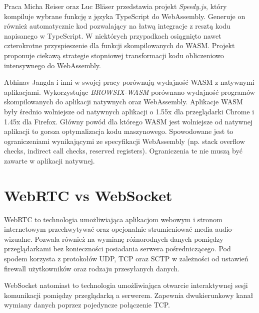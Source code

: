 \documentclass[language=polish,type=master]{aghmodern}
\begin{document}
Praca \cite{wasm_speedyjs} Micha Reiser oraz Luc Bl\"{a}ser przedstawia projekt \emph{Speedy.js}, który kompiluje wybrane funkcję z języka TypeScript\footnotemark{} do WebAssembly.
Generuje on również automatycznie kod pozwalający na łatwą integracje z resztą kodu napisanego w TypeScript.
W niektórych przypadkach osiągnięto nawet czterokrotne przyspieszenie dla funkcji skompilowanych do WASM.
Projekt proponuje ciekawą strategie stopniowej transformacji kodu obliczeniowo intensywnego do WebAssembly.

Abhinav Jangda i inni w swojej pracy \cite{wasm_native} porównują wydajność WASM z natywnymi aplikacjami.
Wykorzystując \emph{BROWSIX-WASM}\footnotemark{} porównano wydajność programów skompilowanych do aplikacji natywnych oraz WebAssembly.
Aplikacje WASM były średnio wolniejsze od natywnych aplikacji o 1.55x dla przeglądarki Chrome i 1.45x dla Firefox.
Główny powód dla którego WASM jest wolniejsze od natywnej aplikacji to gorsza optymalizacja kodu maszynowego.
Spowodowane jest to ograniczeniami wynikającymi ze specyfikacji WebAssembly (np. stack overflow checks, indirect call checks, reserved registers).
Ograniczenia te nie muszą być zawarte w aplikacji natywnej.

\section{WebRTC vs WebSocket}

WebRTC to technologia umożliwiająca aplikacjom webowym i stronom internetowym przechwytywać oraz opcjonalnie strumieniować media audio-wizualne.
Pozwala również na wymianę różnorodnych danych pomiędzy przeglądarkami bez konieczności posiadania serwera pośredniczącego.
Pod spodem korzysta z protokołów UDP, TCP oraz SCTP w zależności od ustawień firewall użytkowników oraz rodzaju przesyłanych danych.

WebSocket natomiast to technologia umożliwiająca otwarcie interaktywnej sesji komunikacji pomiędzy przeglądarką a serwerem.
Zapewnia dwukierunkowy kanał wymiany danych poprzez pojedyncze połączenie TCP.

\backmatter

\cleardoublepage
\listoffigures

\cleardoublepage
\listoftables

\cleardoublepage
\printbibliography
\end{document}
